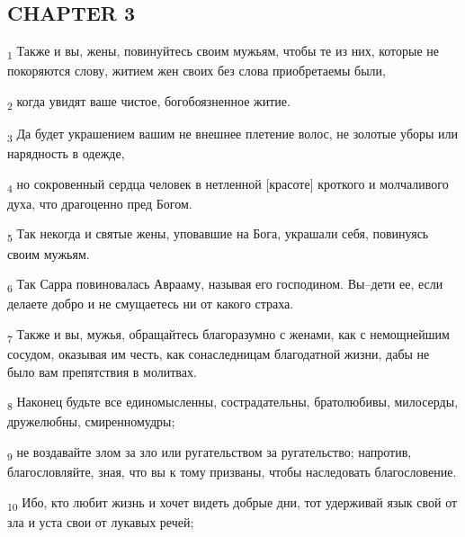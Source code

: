 \subsection{CHAPTER 3}
\begin{tcolorbox}
\textsubscript{1} Также и вы, жены, повинуйтесь своим мужьям, чтобы те из них, которые не покоряются слову, житием жен своих без слова приобретаемы были,
\end{tcolorbox}
\begin{tcolorbox}
\textsubscript{2} когда увидят ваше чистое, богобоязненное житие.
\end{tcolorbox}
\begin{tcolorbox}
\textsubscript{3} Да будет украшением вашим не внешнее плетение волос, не золотые уборы или нарядность в одежде,
\end{tcolorbox}
\begin{tcolorbox}
\textsubscript{4} но сокровенный сердца человек в нетленной [красоте] кроткого и молчаливого духа, что драгоценно пред Богом.
\end{tcolorbox}
\begin{tcolorbox}
\textsubscript{5} Так некогда и святые жены, уповавшие на Бога, украшали себя, повинуясь своим мужьям.
\end{tcolorbox}
\begin{tcolorbox}
\textsubscript{6} Так Сарра повиновалась Аврааму, называя его господином. Вы--дети ее, если делаете добро и не смущаетесь ни от какого страха.
\end{tcolorbox}
\begin{tcolorbox}
\textsubscript{7} Также и вы, мужья, обращайтесь благоразумно с женами, как с немощнейшим сосудом, оказывая им честь, как сонаследницам благодатной жизни, дабы не было вам препятствия в молитвах.
\end{tcolorbox}
\begin{tcolorbox}
\textsubscript{8} Наконец будьте все единомысленны, сострадательны, братолюбивы, милосерды, дружелюбны, смиренномудры;
\end{tcolorbox}
\begin{tcolorbox}
\textsubscript{9} не воздавайте злом за зло или ругательством за ругательство; напротив, благословляйте, зная, что вы к тому призваны, чтобы наследовать благословение.
\end{tcolorbox}
\begin{tcolorbox}
\textsubscript{10} Ибо, кто любит жизнь и хочет видеть добрые дни, тот удерживай язык свой от зла и уста свои от лукавых речей;
\end{tcolorbox}
